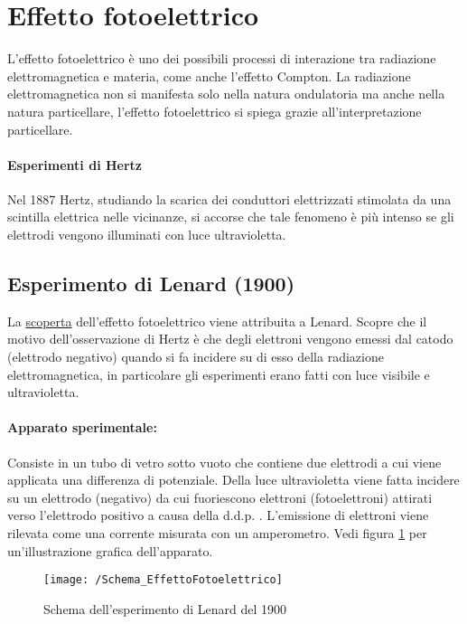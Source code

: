 

\section{Effetto fotoelettrico}
L'effetto fotoelettrico è uno dei possibili processi di interazione tra radiazione elettromagnetica e materia, come anche l'effetto Compton.
La radiazione elettromagnetica non si manifesta solo nella natura ondulatoria ma anche nella natura particellare, l'effetto fotoelettrico si spiega grazie all'interpretazione particellare.

\paragraph{Esperimenti di Hertz}
Nel 1887 Hertz, studiando la scarica dei conduttori elettrizzati stimolata da una scintilla elettrica nelle vicinanze,
si accorse che tale fenomeno è più intenso se gli elettrodi vengono illuminati con luce ultravioletta.

\subsection{Esperimento di Lenard (1900)}
La \underline{scoperta} dell'effetto fotoelettrico viene attribuita a Lenard.
Scopre che il motivo dell'osservazione di Hertz è che degli elettroni vengono emessi dal catodo (elettrodo negativo) quando si fa incidere su di esso della radiazione elettromagnetica, in particolare gli esperimenti erano fatti con luce visibile e ultravioletta.

\paragraph{Apparato sperimentale:} 
Consiste in un tubo di vetro sotto vuoto che contiene due elettrodi a cui viene applicata una differenza di potenziale.
Della luce ultravioletta viene fatta incidere su un elettrodo (negativo) da cui fuoriescono elettroni (fotoelettroni) attirati verso l'elettrodo positivo a causa della d.d.p. .
L'emissione di elettroni viene rilevata come una corrente misurata con un amperometro.
Vedi figura \ref{Schema_EffettoFotoelettrico} per un'illustrazione grafica dell'apparato.
\begin{figure}[h]
\centering
\texttt{[image: /Schema\_EffettoFotoelettrico]}
\caption{Schema dell'esperimento di Lenard del 1900}
\label{Schema_EffettoFotoelettrico}
\end{figure}

